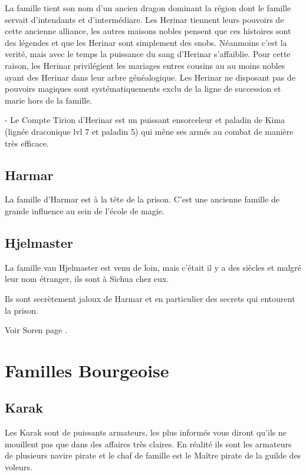 La famille tient son nom d'un ancien dragon dominant la région dont le famille 
servait d'intendants et d'intermédiare. Les Herinar tiennent leurs pouvoirs de cette
ancienne alliance, les autres maisons nobles pensent que ces histoires sont des 
légendes et que les Herinar sont simplement des snobs. Néanmoins c'est la verité,
mais avec le temps la puissance du sang d'Herinar s'affaiblie.
Pour cette raison, les Herinar privilégient les mariages entres cousins au au moins
nobles ayant des Herinar dans leur arbre généalogique. Les Herinar ne disposant pas 
de pouvoirs magiques sont systématiquements exclu de la ligne de succession et
marie hors de la famille.

- Le Compte Tirion d'Herinar est un puissant ensorceleur et paladin de Kima
  (lignée draconique lvl 7 et paladin 5) qui mêne ses armés au combat de manière
  très efficace.



\subsection*{Harmar}

La famille d'Harmar est à la tête de la prison. C'est une ancienne famille de 
grande influence au sein de l'école de magie.

\subsection*{Hjelmaster}

La famille van Hjelmaster est venu de loin, mais c'était il y a des 
siècles et malgré leur nom étranger, ils sont à Sichua chez eux.

Ils sont secrètement jaloux de Harmar et en particulier des secrets
qui entourent la prison.

Voir Soren page \pageref{SorenVH}.

\section{Familles Bourgeoise}

\subsection*{Karak}

Les Karak sont de puissants armateurs, les plus informés vous diront qu'ils
ne mouillent pas que dans des affaires très claires. En réalité ils sont les
armateurs de plusieurs navire pirate et le chaf de famille est le Maître pirate
de la guilde des voleurs.

